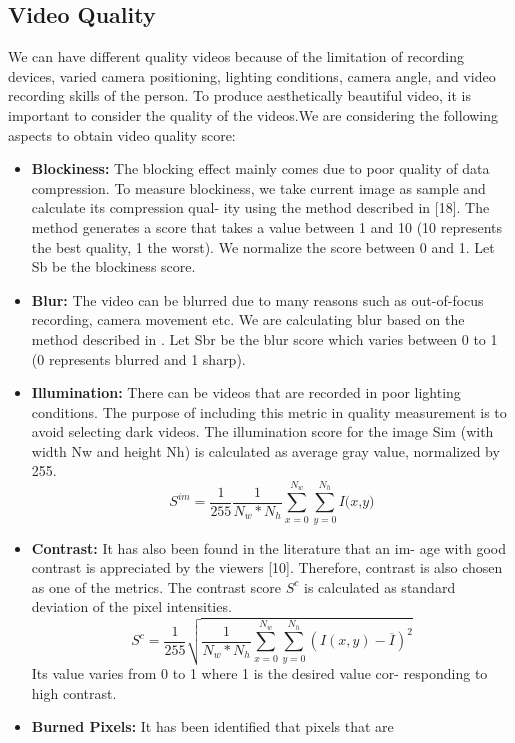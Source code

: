 \documentclass{sig-alternate}
\begin{document}
\subsection{Video Quality}
We can have different quality videos because of the limitation of
recording devices, varied camera positioning, lighting conditions,
camera angle, and video recording skills of the person. To produce
aesthetically beautiful video, it is important to consider the quality
of the videos.We are considering the following aspects to obtain
video quality score:
\begin{itemize}
    \item \textbf{Blockiness:} The blocking effect mainly comes due to poor
quality of data compression. To measure blockiness, we take
current image as sample and calculate its compression qual-
ity using the method described in [18]. The method generates
a score that takes a value between 1 and 10 (10 represents the
best quality, 1 the worst). We normalize the score between 0
and 1. Let Sb be the blockiness score.
    \item \textbf{Blur:} The video can be blurred due to many reasons such as
out-of-focus recording, camera movement etc. We are calculating blur based on the method described in \cite{crete:blur}. Let Sbr
be the blur score which varies between 0 to 1 (0 represents
blurred and 1 sharp).
    \item \textbf{Illumination:} There can be videos that are recorded in poor
lighting conditions. The purpose of including this metric in
quality measurement is to avoid selecting dark videos. The
illumination score for the image Sim (with width Nw and
height Nh) is calculated as average gray value, normalized
by 255.
\begin{equation}
S^{im} = \frac{1}{255}\frac{1}{N_w*N_h}\sum_{x=0}^{N_w}\sum_{y=0}^{N_h}\textit{I(x,y)}
\end{equation}
    \item \textbf{Contrast:} It has also been found in the literature that an im-
age with good contrast is appreciated by the viewers [10].
Therefore, contrast is also chosen as one of the metrics. The
contrast score $S^c$ is calculated as standard deviation of the
pixel intensities. 
\begin{equation}
S^{c} = \frac{1}{255}\sqrt{\frac{1}{N_w*N_h}\sum_{x=0}^{N_w}\sum_{y=0}^{N_h} (I(x,y)-\overline{I})^{2}}
\end{equation}
Its value varies from 0 to 1 where 1 is the desired value cor-
responding to high contrast.
    \item \textbf{Burned Pixels:} It has been identified that pixels that are

\end{itemize}
\end{document}
